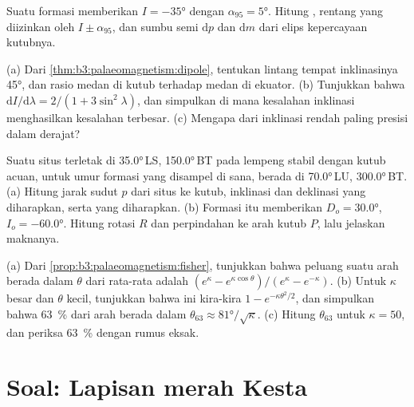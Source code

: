 \begin{exercise}[$\star\star$]\label{exo:b3:palaeomagnetism:9}
Suatu formasi memberikan $I = \ang{-35}$ dengan $\alpha_{95} = \ang{5}$. Hitung
, rentang  yang diizinkan oleh $I \pm \alpha_{95}$,
dan sumbu semi $\mathrm dp$ dan $\mathrm dm$ dari elips kepercayaan
kutubnya.
\end{exercise}

\begin{exercise}[$\star\star\star$]\label{exo:b3:palaeomagnetism:10}
(a) Dari \cref{thm:b3:palaeomagnetism:dipole}, tentukan lintang tempat
inklinasinya \ang{45}, dan rasio medan di kutub terhadap medan di
ekuator. (b) Tunjukkan bahwa $\mathrm dI/\mathrm d\lambda = 2/(1 + 3\sin^2\lambda)$,
dan simpulkan di mana kesalahan inklinasi menghasilkan kesalahan
 terbesar. (c) Mengapa  dari inklinasi rendah
paling presisi dalam derajat?
\end{exercise}

\begin{exercise}[$\star\star\star$]\label{exo:b3:palaeomagnetism:11}
Suatu situs terletak di \ang{35.0}\,LS, \ang{150.0}\,BT pada lempeng stabil dengan
kutub acuan, untuk umur formasi yang disampel di sana, berada di \ang{70.0}\,LU,
\ang{300.0}\,BT. (a) Hitung jarak sudut $p$ dari situs ke kutub,
inklinasi dan deklinasi yang diharapkan, serta  yang diharapkan.
(b) Formasi itu memberikan $D_o = \ang{30.0}$, $I_o = \ang{-60.0}$. Hitung
rotasi $R$ dan perpindahan ke arah kutub $P$, lalu jelaskan maknanya.
\end{exercise}

\begin{exercise}[$\star\star\star$]\label{exo:b3:palaeomagnetism:12}
(a) Dari \cref{prop:b3:palaeomagnetism:fisher}, tunjukkan bahwa peluang
suatu arah berada dalam $\theta$ dari rata-rata adalah $(e^\kappa -
e^{\kappa\cos\theta})/(e^\kappa - e^{-\kappa})$. (b) Untuk $\kappa$ besar dan
$\theta$ kecil, tunjukkan bahwa ini kira-kira $1 - e^{-\kappa\theta^2/2}$, dan simpulkan
bahwa \qty{63}{\percent} dari arah berada dalam $\theta_{63} \approx
\ang{81}/\sqrt\kappa$. (c) Hitung $\theta_{63}$ untuk $\kappa = 50$, dan periksa
\qty{63}{\percent} dengan rumus eksak.
\end{exercise}

\section{Soal: Lapisan merah Kesta}

